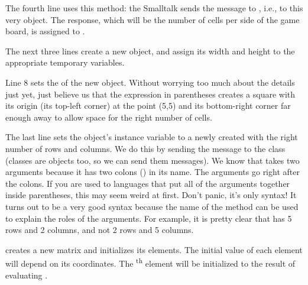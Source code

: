 \documentclass[a4paper,10pt,twoside]{book}
\begin{document}
{The fourth line uses this method: 
the Smalltalk  sends the message  to , i.e., to this very object.  
The response, which will be the number of cells per side of the game board, is assigned to .

The next three lines create a new  object, and assign its width and height to the appropriate temporary variables. 

Line 8 sets the  of the new object.
Without worrying too much about the details just yet, just believe us that the expression in parentheses creates a square with its origin (\ie its top-left corner) at the point (5,5) and its bottom-right corner far enough away to allow space for the right number of cells.

The last line sets the  object's instance variable  to a newly created  with the right number of rows and columns.   We do this by sending the message  to the  class (classes are objects too, so we can send them messages).  We know that  takes two arguments because it has two colons (\ct{:}) in its name.   The arguments go right after the colons.
If you are used to languages that put all of the arguments together inside parentheses, this may seem weird at first.  Don't panic, it's only syntax!
It turns out to be a very good syntax because the name of the method can be used to explain the roles of the arguments.  For example, it is pretty clear that  has 5 rows and 2 columns, and not 2 rows and 5 columns.

 creates a new  matrix and initializes its elements.  The initial value of each element will depend on its coordinates.  The \textsuperscript{th} element will be initialized to the result of evaluating .  



}
\end{document}
